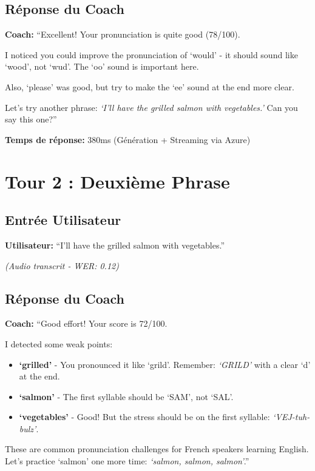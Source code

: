 \documentclass[12pt,a4paper,oneside]{report}
\begin{document}
\subsection{Réponse du Coach}

\begin{tcolorbox}[colback=coachgreen!10, colframe=coachgreen, title=Coach IA - Feedback]
\textbf{Coach:} ``Excellent! Your pronunciation is quite good (78/100). 

I noticed you could improve the pronunciation of `would' - it should sound like `wood', 
not `wud'. The `oo' sound is important here.

Also, `please' was good, but try to make the `ee' sound at the end more clear.

Let's try another phrase: \textit{`I'll have the grilled salmon with vegetables.'}
Can you say this one?''
\end{tcolorbox}

\vspace{0.5cm}

\textbf{Temps de réponse:} 380ms (Génération + Streaming via Azure)

\section{Tour 2 : Deuxième Phrase}

\subsection{Entrée Utilisateur}

\begin{tcolorbox}[colback=userblue!10, colframe=userblue, title=Utilisateur - Tentative 2]
\textbf{Utilisateur:} ``I'll have the grilled salmon with vegetables.''

\textit{(Audio transcrit - WER: 0.12)}
\end{tcolorbox}

\subsection{Réponse du Coach}

\begin{tcolorbox}[colback=coachgreen!10, colframe=coachgreen, title=Coach IA - Feedback Détaillé]
\textbf{Coach:} ``Good effort! Your score is 72/100. 

I detected some weak points:
\begin{itemize}
    \item \textbf{`grilled'} - You pronounced it like `grild'. Remember: \textit{`GRILD'} with a clear `d' at the end.
    \item \textbf{`salmon'} - The first syllable should be `SAM', not `SAL'. 
    \item \textbf{`vegetables'} - Good! But the stress should be on the first syllable: \textit{`VEJ-tuh-bulz'}.
\end{itemize}

These are common pronunciation challenges for French speakers learning English. 
Let's practice `salmon' one more time: \textit{`salmon, salmon, salmon'}.''
\end{tcolorbox}
\end{document}
